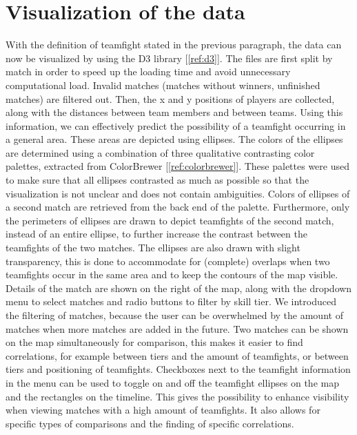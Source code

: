 \documentclass[11pt,twoside,a4paper]{article}
\begin{document}
\section*{Visualization of the data}
With the definition of teamfight stated in the previous paragraph, the data can now be visualized by using the D3 library [\ref{ref:d3}]. The files are first split by match in order to speed up the loading time and avoid unnecessary computational load. Invalid matches (matches without winners, unfinished matches) are filtered out. 
\newline\newline
Then, the x and y positions of players are collected, along with the distances between team members and between teams. Using this information, we can effectively predict the possibility of a teamfight occurring in a general area. These areas are depicted using ellipses. The colors of the ellipses are determined using a combination of three qualitative contrasting color palettes, extracted from ColorBrewer [\ref{ref:colorbrewer}]. These palettes were used to make sure that all ellipses contrasted as much as possible so that the visualization is not unclear and does not contain ambiguities. Colors of ellipses of a second match are retrieved from the back end of the palette. Furthermore, only the perimeters of ellipses are drawn to depict teamfights of the second match, instead of an entire ellipse, to further increase the contrast between the teamfights of the two matches.
The ellipses are also drawn with slight transparency, this is done to accommodate for (complete) overlaps when two teamfights occur in the same area and to keep the contours of the map visible.
\newline\newline
Details of the match are shown on the right of the map, along with the dropdown menu to select matches and radio buttons to filter by skill tier. We introduced the filtering of matches, because the user can be overwhelmed by the amount of matches when more matches are added in the future. Two matches can be shown on the map simultaneously for comparison, this makes it easier to find correlations, for example between tiers and the amount of teamfights, or between tiers and positioning of teamfights. 
\newline\newline
Checkboxes next to the teamfight information in the menu can be used to toggle on and off the teamfight ellipses on the map and the rectangles on the timeline. This gives the possibility to enhance visibility when viewing matches with a high amount of teamfights. It also allows for specific types of comparisons and the finding of specific correlations. \newline\newline
\end{document}
